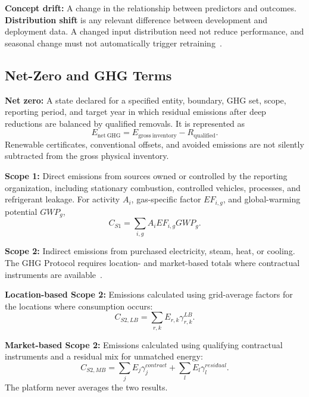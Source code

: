 \textbf{Concept drift:} A change in the relationship between predictors and outcomes. \textbf{Distribution shift} is any relevant difference between development and deployment data. A changed input distribution need not reduce performance, and seasonal change must not automatically trigger retraining~\cite{gama2014drift}.

\subsection{Net-Zero and GHG Terms}

\textbf{Net zero:} A state declared for a specified entity, boundary, GHG set, scope, reporting period, and target year in which residual emissions after deep reductions are balanced by qualified removals. It is represented as
\begin{equation}
	E_{\mathrm{net\ GHG}}=E_{\mathrm{gross\ inventory}}-R_{\mathrm{qualified}}.
	\label{eq:net-ghg}
\end{equation}
Renewable certificates, conventional offsets, and avoided emissions are not silently subtracted from the gross physical inventory.

\textbf{Scope 1:} Direct emissions from sources owned or controlled by the reporting organization, including stationary combustion, controlled vehicles, processes, and refrigerant leakage. For activity $A_i$, gas-specific factor $EF_{i,g}$, and global-warming potential $GWP_g$,
\begin{equation}
	C_{S1}=\sum_{i,g}A_iEF_{i,g}GWP_g.
\end{equation}

\textbf{Scope 2:} Indirect emissions from purchased electricity, steam, heat, or cooling. The GHG Protocol requires location- and market-based totals where contractual instruments are available~\cite{ghg_scope2}.

\textbf{Location-based Scope 2:} Emissions calculated using grid-average factors for the locations where consumption occurs:
\begin{equation}
	C_{S2,LB}=\sum_{r,k}E_{r,k}\gamma^{LB}_{r,k}.
	\label{eq:location-carbon}
\end{equation}

\textbf{Market-based Scope 2:} Emissions calculated using qualifying contractual instruments and a residual mix for unmatched energy:
\begin{equation}
	C_{S2,MB}=\sum_jE_j\gamma_j^{contract}+\sum_lE_l\gamma_l^{residual}.
	\label{eq:market-carbon}
\end{equation}
The platform never averages the two results.


